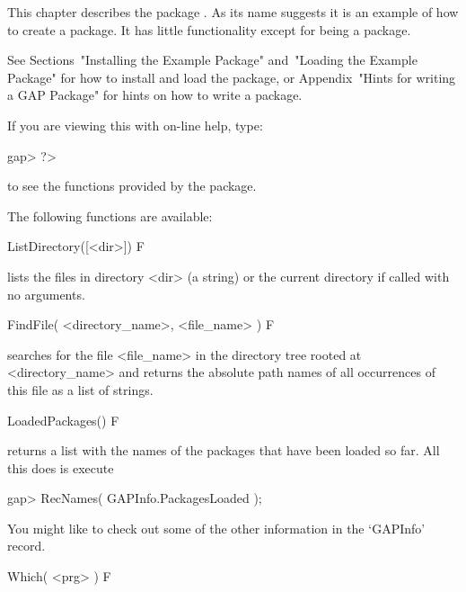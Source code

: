 

This chapter  describes  the  {\GAP}  package  {\Example}.  As  its  name
suggests it is an example of how to  create  a  {\GAP}  package.  It  has
little functionality except for being a package.

See Sections~"Installing the Example Package"  and~"Loading  the  Example
Package"  for  how  to  install  and  load  the  {\Example}  package,  or
Appendix~"Hints for writing a GAP Package" for hints on how  to  write  a
{\GAP} package.

If you are viewing this with on-line help, type: 

\beginexample
gap> ?>
\endexample

to see the functions provided by the {\Example} package.


The following functions are available:

\>ListDirectory([<dir>]) F

lists the files in directory <dir> (a string) or the current directory if
called with no arguments.

\>FindFile( <directory_name>, <file_name> ) F

searches  for the  file   <file_name> in  the  directory  tree  rooted at
<directory_name> and returns the absolute path names of  all  occurrences
of this file as a list of strings.

\>LoadedPackages() F

returns a list with the names of the packages that have  been  loaded  so
far. All this does is execute

\beginexample
gap> RecNames( GAPInfo.PackagesLoaded );
\endexample

You might like to check out some of the other information in the `GAPInfo'
record.

\>Which( <prg> ) F

